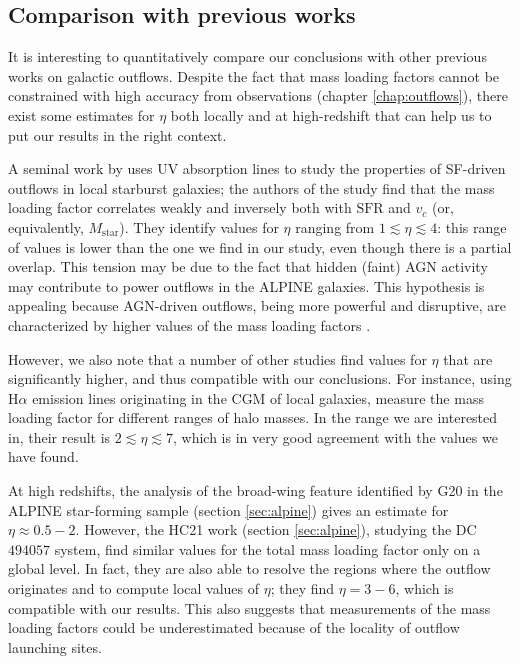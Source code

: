 \subsection{Comparison with previous works} 


It is interesting to quantitatively compare our conclusions with other previous works on galactic outflows. Despite the fact that mass loading factors cannot be constrained with high accuracy from observations (chapter \ref{chap:outflows}), there exist some estimates for $\eta$ both locally and at high-redshift that can help us to put our results in the right context.

A seminal work by \citet{Heckman15} uses UV absorption lines to study the properties of SF-driven outflows in local starburst galaxies; the authors of the study find that the mass loading factor correlates weakly and inversely both with $\mathrm{SFR}$ and $v_c$ (or, equivalently, $M_\mathrm{star}$). They identify values for $\eta$ ranging from $1 \lesssim \eta \lesssim 4$: this range of values is lower than the one we find in our study, even though there is a partial overlap. This tension may be due to the fact that hidden (faint) AGN activity may contribute to power outflows in the ALPINE galaxies. This hypothesis is appealing because AGN-driven outflows, being more powerful and disruptive, are characterized by higher values of the mass loading factors \citep[see e.g.,][]{Fiore_2017,fluetsch2019cold}. 

However, we also note that a number of other studies find values for $\eta$ that are significantly higher, and thus compatible with our conclusions. For instance, using H$\alpha$ emission lines originating in the CGM of local galaxies, \citet{zhang2021empirical} measure the mass loading factor for different ranges of halo masses. In the range we are interested in, their result is $2 \lesssim \eta \lesssim 7$, which is in very good agreement with the values we have found.

At high redshifts, the analysis of the broad-wing feature identified by G20 \citep{ginolfi:2019} in the ALPINE star-forming sample (section \ref{sec:alpine}) gives an estimate for $\eta\approx 0.5-2$. However, the HC21 work \citep{herrera2021kiloparsec} (section \ref{sec:alpine}), studying the DC$494057$ system, find similar values for the total mass loading factor only on a global level. In fact, they are also able to resolve the regions where the outflow originates and to compute local values of $\eta$; they find $\eta = 3-6$, which is compatible with our results. This also suggests that measurements of the mass loading factors could be underestimated because of the locality of outflow launching sites. 

